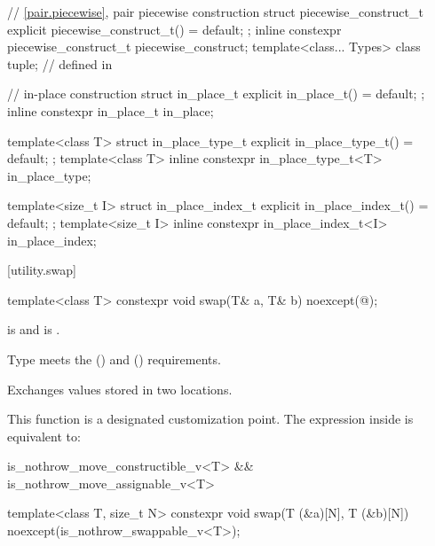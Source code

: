 \begin{codeblock}
{  // \ref{pair.piecewise}, pair piecewise construction
  struct piecewise_construct_t {
    explicit piecewise_construct_t() = default;
  };
  inline constexpr piecewise_construct_t piecewise_construct{};
  template<class... Types> class tuple;         // defined in 

  // in-place construction%
%
%
%
%
%
  struct in_place_t {
    explicit in_place_t() = default;
  };
  inline constexpr in_place_t in_place{};

  template<class T>
    struct in_place_type_t {
      explicit in_place_type_t() = default;
    };
  template<class T> inline constexpr in_place_type_t<T> in_place_type{};

  template<size_t I>
    struct in_place_index_t {
      explicit in_place_index_t() = default;
    };
  template<size_t I> inline constexpr in_place_index_t<I> in_place_index{};
}
\end{codeblock}

[utility.swap]{}

%
\begin{itemdecl}
template<class T>
  constexpr void swap(T& a, T& b) noexcept(@\seebelow@);
\end{itemdecl}

\begin{itemdescr}
\pnum
\constraints
{} is  and
 is .

\pnum
\expects
Type
meets the
 ()
and
 ()
requirements.

\pnum
\effects
Exchanges values stored in two locations.

\pnum
\remarks
This function
is a designated customization point.
The expression inside  is equivalent to:

\begin{codeblock}
is_nothrow_move_constructible_v<T> && is_nothrow_move_assignable_v<T>
\end{codeblock}
\end{itemdescr}

%
\begin{itemdecl}
template<class T, size_t N>
  constexpr void swap(T (&a)[N], T (&b)[N]) noexcept(is_nothrow_swappable_v<T>);
\end{itemdecl}

